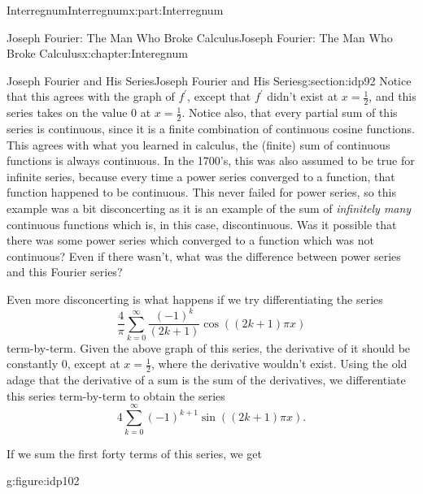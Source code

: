 \begin{partptx}{Interregnum}{}{Interregnum}{}{}{x:part:Interregnum}
\begin{chapterptx}{Joseph Fourier: The Man Who Broke Calculus}{}{Joseph Fourier: The Man Who Broke Calculus}{}{}{x:chapter:Interegnum}
\begin{sectionptx}{Joseph Fourier and His Series}{}{Joseph Fourier and His Series}{}{}{g:section:idp92}
			Notice that this agrees with the graph of \(f^\prime\), except that \(f^\prime\) didn't exist at \(x=\frac{1}{2}\), and this series takes on the value \(0\) at \(x=\frac{1}{2}\). Notice also, that every partial sum of this series is continuous, since it is a finite combination of continuous cosine functions. This agrees with what you learned in calculus, the (finite) sum of continuous functions is always continuous. In the 1700's, this was also assumed to be true for infinite series, because every time a power series converged to a function, that function happened to be continuous. This never failed for power series, so this example was a bit disconcerting as it is an example of the sum of \emph{infinitely many} continuous functions which is, in this case, discontinuous. Was it possible that there was some power series which converged to a function which was not continuous? Even if there wasn't, what was the difference between power series and this Fourier series?%
			\par
			Even more disconcerting is what happens if we try differentiating the series%
			\begin{equation*}
				\frac{4}{\pi}\sum_{k=0}^\infty\frac{\left(-1\right)^k}{\left(2k+1\right)} \cos\left(\left(2k+1\right)\pi x\right)
			\end{equation*}
			term-by-term. Given the above graph of this series, the derivative of it should be constantly 0, except at \(x=\frac{1}{2}\), where the derivative wouldn't exist. Using the old adage that the derivative of a sum is the sum of the derivatives, we differentiate this series term-by-term to obtain the series%
			\begin{equation*}
				4\sum_{k=0}^\infty\left(-1\right)^{k+1}\sin\left(\left(2k+1\right)\pi x\right)\text{.}
			\end{equation*}
			\par
			If we sum the first forty terms of this series, we get \begin{figureptx}{}{g:figure:idp102}{}%
				\centering
				\begin{image}{0}{1}{0}%

\end{image}
\end{figureptx}
\end{sectionptx}
\end{chapterptx}
\end{partptx}
